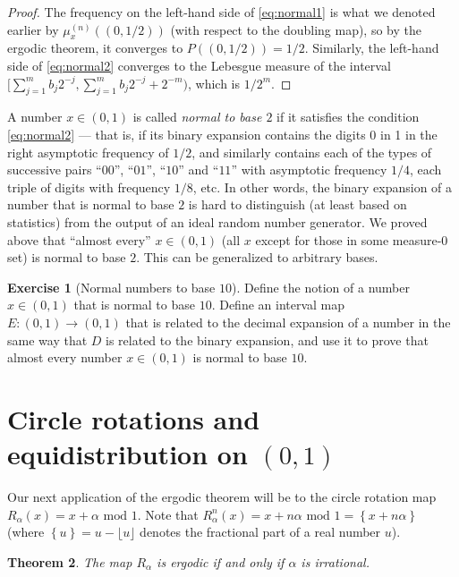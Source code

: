 \documentclass[11pt]{report}
\theoremstyle{plain}
\newtheorem{thm}{Theorem}[chapter]
\theoremstyle{definition}
\newtheorem{xexercise}[thm]{Exercise}
\begin{document}
\begin{proof}
The frequency on the left-hand side of \eqref{eq:normal1}
is what we denoted earlier by $\mu_x^{(n)}((0,1/2))$
(with respect to the doubling map), so by the ergodic
theorem, it converges to $P((0,1/2))=1/2$. Similarly,
the left-hand side of \eqref{eq:normal2} converges to the
Lebesgue measure of the interval
$[\sum_{j=1}^m b_j 2^{-j},\sum_{j=1}^m b_j
2^{-j}+2^{-m})$,
which is $1/2^m$.
\end{proof}

\noindent A number $x\in (0,1)$ is called \emph{normal to base $2$}
if it satisfies the condition \eqref{eq:normal2} --- that
is, if its binary expansion contains the digits 0 in 1
in the right asymptotic frequency of $1/2$, and
similarly contains each of the types of successive
pairs ``$00$'', ``$01$'', ``$10$'' and ``$11$'' with
asymptotic frequency $1/4$, each triple of digits with
frequency $1/8$, etc. In other words, the binary
expansion of a number that is normal to base $2$ is
hard to distinguish (at least based on statistics)
from the output of an ideal random number generator.
We proved above that ``almost every'' $x\in (0,1)$
(all $x$ except for those in some measure-$0$ set) is
normal to base $2$. This can be generalized to
arbitrary bases.

\begin{xexercise}[Normal numbers to base $10$]
Define the notion of a number $x\in(0,1)$ that is
normal to base $10$. Define an interval map
$E:(0,1)\to(0,1)$ that is related to the decimal
expansion of a number in the same way that $D$ is
related to the binary expansion, and use it to prove
that almost every number $x\in(0,1)$ is normal to base
$10$.
\end{xexercise}

\section{Circle rotations and equidistribution on $(0,1)$}

Our next application of the ergodic theorem will be to
the circle rotation map
$R_\alpha(x)=x+\alpha\textrm{ mod }1$. Note that
$R_\alpha^n(x)=x+n\alpha\textrm{ mod }1 = \left\{
x+n\alpha \right\}$
(where $\left\{u\right\}=u-\lfloor u \rfloor$ denotes
the fractional part of a real number $u$).

\begin{thm}
The map $R_\alpha$ is ergodic if and only if $\alpha$
is irrational.
\end{thm}
\end{document}
